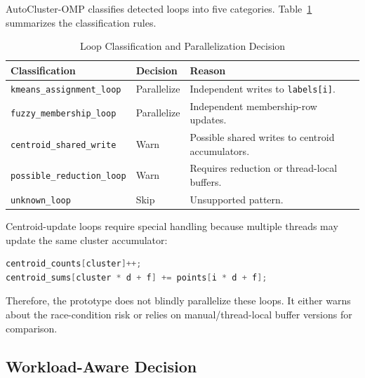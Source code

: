 \documentclass[conference,10pt]{IEEEtran}
\begin{document}
AutoCluster-OMP classifies detected loops into five categories. Table~\ref{tab:classification} summarizes the classification rules.

\begin{table}[t]
\centering
\caption{Loop Classification and Parallelization Decision}
\label{tab:classification}
\scriptsize
\setlength{\tabcolsep}{3pt}
\renewcommand{\arraystretch}{1.15}
\begin{tabularx}{\columnwidth}{p{}p{}X}
\toprule
\textbf{Classification} & \textbf{Decision} & \textbf{Reason}\\
\midrule
\texttt{kmeans\_assignment\_loop} 
& Parallelize 
& Independent writes to \texttt{labels[i]}.\\

\texttt{fuzzy\_membership\_loop} 
& Parallelize 
& Independent membership-row updates.\\

\texttt{centroid\_shared\_write} 
& Warn 
& Possible shared writes to centroid accumulators.\\

\texttt{possible\_reduction\_loop} 
& Warn 
& Requires reduction or thread-local buffers.\\

\texttt{unknown\_loop} 
& Skip 
& Unsupported pattern.\\
\bottomrule
\end{tabularx}
\end{table}

Centroid-update loops require special handling because multiple threads may update the same cluster accumulator:

\vspace{6pt}
\noindent{}\par
\vspace{4pt}
\begin{lstlisting}[language=C]
centroid_counts[cluster]++;
centroid_sums[cluster * d + f] += points[i * d + f];
\end{lstlisting}

Therefore, the prototype does not blindly parallelize these loops. It either warns about the race-condition risk or relies on manual/thread-local buffer versions for comparison.

\subsection{Workload-Aware Decision}
\end{document}
